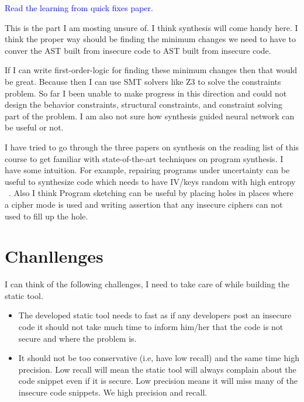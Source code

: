 \documentclass[sigconf]{acmart}
\begin{document}
\iffalse
\textcolor{blue}{Read the learning from quick fixes paper.}

This is the part I am mosting unsure of. I think synthesis will come handy here. 
I think the proper way should be finding the minimum changes we need to have to conver the AST built from insecure code to AST built from insecure code.  

If I can write first-order-logic for finding these minimum changes then that would be great. Because then I can use SMT solvers like Z3 to solve the constraints problem. 
So far I been unable to make progress in this direction and could not design the behavior constraints, structural constraints, and constraint solving part of the problem. I am also not sure how synthesis guided neural network can be useful or not. 

I have tried to go through the three papers on synthesis on the reading list of this course to get familiar with state-of-the-art techniques on program synthesis. I have some intuition. For example, repairing programs under uncertainty can be useful to synthesize code which needs to have IV/keys random with high entropy ~\cite{albarghouthi2017repairing}. Also I think Program sketching can be useful by placing holes in places where a cipher mode is used and writing assertion that any insecure ciphers can not used to fill up the hole.    

\section{Chanllenges}
I can think of the following challenges, I need to take care of while building the static tool.
\begin{itemize}
  \item The developed static tool needs to fast as if any developers post an insecure code it should not take much time to inform him/her that the code is not secure and where the problem is.
  \item It should not be too conservative (i.e, have low recall) and the same time high precision. Low recall will mean the static tool will always complain about the code snippet even if it is secure. Low precision means it will miss many of the insecure code snippets. We high precision and recall. 
\end{itemize}
\end{document}
